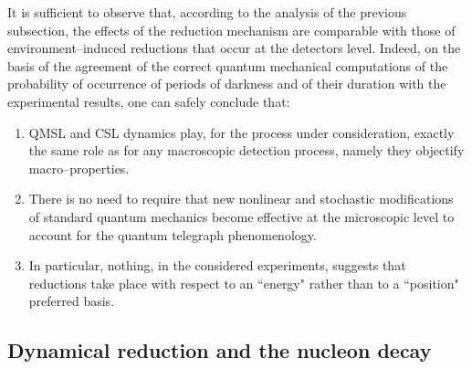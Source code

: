 \documentclass[12pt]{article}
\begin{document}
It is sufficient to observe that, according to the analysis of the
previous subsection, the effects of the reduction mechanism are
comparable with those of environment--induced reductions that
occur at the detectors level.
Indeed, on the basis of the agreement of the correct quantum
mechanical computations of the probability of occurrence of
periods of darkness and of their duration with the experimental
results, one can safely conclude that:
\begin{enumerate}
\item QMSL and CSL dynamics play, for the process under
consideration, exactly the same role as for any macroscopic
detection process, namely they objectify macro--properties.
\item There is no need to require that new nonlinear and stochastic
modifications of standard quantum mechanics become effective at
the microscopic level to account for the quantum telegraph
phenomenology.
\item In particular, nothing, in the considered experiments, suggests
that reductions take place with respect to an ``energy" rather
than to a ``position" preferred basis.
\end{enumerate}


\subsection{Dynamical reduction and the nucleon decay} \label{sec153}
\end{document}
